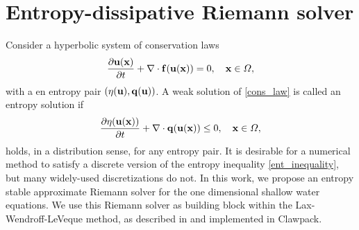 \documentclass[preprint, 11pt]{article}
\newcommand{\bff}{{\bf f}}
\newcommand{\bfu}{{\bf u}}
\newcommand{\bfq}{{\bf q}}
\newcommand{\bfx}{{\bf x}}
\begin{document}
\section{Entropy-dissipative Riemann solver}\label{sec:ent_diss_rs}
Consider a hyperbolic system of conservation laws
\begin{align}\label{cons_law}
  \frac{\partial \bfu(\bfx)}{\partial t} + \nabla\cdot \bff(\bfu(\bfx))=0, \quad \bfx\in\Omega,
\end{align}
with a en entropy pair $\left(\eta(\bfu), \bfq(\bfu)\right)$.
A weak solution of \eqref{cons_law} is called an entropy solution if
\begin{align}\label{ent_inequality}
  \frac{\partial \eta(\bfu(\bfx))}{\partial t} + \nabla\cdot \bfq(\bfu(\bfx))\leq 0, \quad \bfx\in\Omega,
\end{align}
holds, in a distribution sense, for any entropy pair.
It is desirable for a numerical method to satisfy a discrete version of the entropy inequality
\eqref{ent_inequality}, but many widely-used discretizations do not.
In this work, we propose an entropy stable approximate Riemann solver for the one dimensional
shallow water equations. We use this Riemann solver as building block within the Lax-Wendroff-LeVeque
method, as described in \cite{leveque1997wave,leveque2002finite} and implemented in Clawpack.
\end{document}
